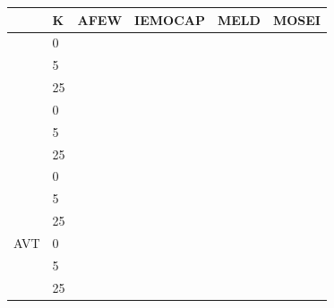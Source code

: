 \newcommand{\famtable}[1]{%
\begin{tabular}{@{}llrrrr@{}}
\toprule
\T{生徒}{Student} & K & AFEW & IEMOCAP & MELD & MOSEI \\
\midrule
\T{音声}{audio} & 0 & \fc{#1}{AFEW}{A}{zero} & \fc{#1}{IEMOCAP}{A}{zero} & \fc{#1}{MELD}{A}{zero} & \fc{#1}{MOSEI}{A}{zero} \\
 & 5 & \fc{#1}{AFEW}{A}{five} & \fc{#1}{IEMOCAP}{A}{five} & \fc{#1}{MELD}{A}{five} & \fc{#1}{MOSEI}{A}{five} \\
 & 25 & \fc{#1}{AFEW}{A}{twofive} & \fc{#1}{IEMOCAP}{A}{twofive} & \fc{#1}{MELD}{A}{twofive} & \fc{#1}{MOSEI}{A}{twofive} \\
\T{顔}{face} & 0 & \fc{#1}{AFEW}{V}{zero} & \fc{#1}{IEMOCAP}{V}{zero} & \fc{#1}{MELD}{V}{zero} & \fc{#1}{MOSEI}{V}{zero} \\
 & 5 & \fc{#1}{AFEW}{V}{five} & \fc{#1}{IEMOCAP}{V}{five} & \fc{#1}{MELD}{V}{five} & \fc{#1}{MOSEI}{V}{five} \\
 & 25 & \fc{#1}{AFEW}{V}{twofive} & \fc{#1}{IEMOCAP}{V}{twofive} & \fc{#1}{MELD}{V}{twofive} & \fc{#1}{MOSEI}{V}{twofive} \\
\T{言葉}{text} & 0 & \fc{#1}{AFEW}{T}{zero} & \fc{#1}{IEMOCAP}{T}{zero} & \fc{#1}{MELD}{T}{zero} & \fc{#1}{MOSEI}{T}{zero} \\
 & 5 & \fc{#1}{AFEW}{T}{five} & \fc{#1}{IEMOCAP}{T}{five} & \fc{#1}{MELD}{T}{five} & \fc{#1}{MOSEI}{T}{five} \\
 & 25 & \fc{#1}{AFEW}{T}{twofive} & \fc{#1}{IEMOCAP}{T}{twofive} & \fc{#1}{MELD}{T}{twofive} & \fc{#1}{MOSEI}{T}{twofive} \\
AVT & 0 & \fc{#1}{AFEW}{AVT}{zero} & \fc{#1}{IEMOCAP}{AVT}{zero} & \fc{#1}{MELD}{AVT}{zero} & \fc{#1}{MOSEI}{AVT}{zero} \\
 & 5 & \fc{#1}{AFEW}{AVT}{five} & \fc{#1}{IEMOCAP}{AVT}{five} & \fc{#1}{MELD}{AVT}{five} & \fc{#1}{MOSEI}{AVT}{five} \\
 & 25 & \fc{#1}{AFEW}{AVT}{twofive} & \fc{#1}{IEMOCAP}{AVT}{twofive} & \fc{#1}{MELD}{AVT}{twofive} & \fc{#1}{MOSEI}{AVT}{twofive} \\
\bottomrule
\end{tabular}}

\begin{frame}[label=appfam1]{}
\scriptsize\centering
\famtable{famone}

\vspace{0.3em}
\end{frame}

